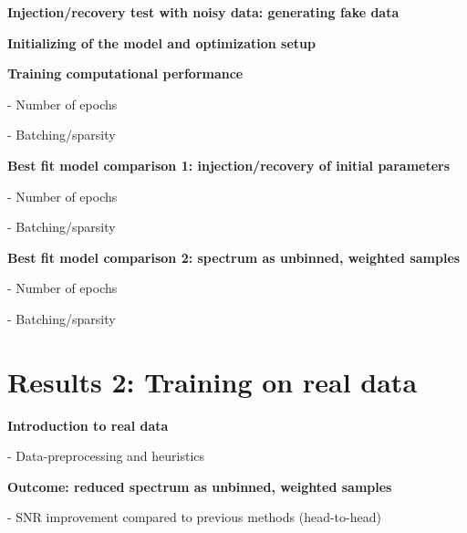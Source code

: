 \documentclass[twocolumn]{aastex631}
\begin{document}
\begin{mdframed}
  \textbf{Injection/recovery test with noisy data: generating fake data} \par
  \textcolor{lightgray}{\lipsum[9]}
\end{mdframed}

\begin{mdframed}
  \textbf{Initializing of the model and optimization setup} \par
  \textcolor{lightgray}{\lipsum[10]}
\end{mdframed}


\begin{mdframed}
  \textbf{Training computational performance} \par
  - Number of epochs\par
  - Batching/sparsity\par
  \textcolor{lightgray}{\lipsum[9]}
\end{mdframed}

\begin{mdframed}
  \textbf{Best fit model comparison 1: injection/recovery of initial parameters} \par
  - Number of epochs\par
  - Batching/sparsity\par
  \textcolor{lightgray}{\lipsum[10]}
\end{mdframed}

\begin{mdframed}
  \textbf{Best fit model comparison 2: spectrum as unbinned, weighted samples} \par
  - Number of epochs\par
  - Batching/sparsity\par
  \textcolor{lightgray}{\lipsum[11]}
\end{mdframed}


\section{Results 2: Training on real data}
\begin{mdframed}
  \textbf{Introduction to real data} \par
  - Data-preprocessing and heuristics \par
  \textcolor{lightgray}{\lipsum[12]}
\end{mdframed}

\begin{mdframed}
  \textbf{Outcome: reduced spectrum as unbinned, weighted samples} \par
  - SNR improvement compared to previous methods (head-to-head)\par
  \textcolor{lightgray}{\lipsum[13]}
\end{mdframed}
\end{document}
